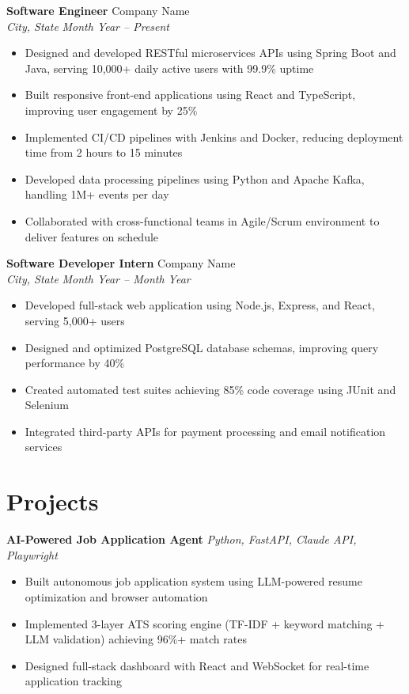 \documentclass[11pt,a4paper]{article}
\begin{document}
\textbf{Software Engineer} \hfill Company Name\\
\textit{City, State} \hfill \textit{Month Year -- Present}
\begin{itemize}
    \item Designed and developed RESTful microservices APIs using Spring Boot and Java, serving 10,000+ daily active users with 99.9\% uptime
    \item Built responsive front-end applications using React and TypeScript, improving user engagement by 25\%
    \item Implemented CI/CD pipelines with Jenkins and Docker, reducing deployment time from 2 hours to 15 minutes
    \item Developed data processing pipelines using Python and Apache Kafka, handling 1M+ events per day
    \item Collaborated with cross-functional teams in Agile/Scrum environment to deliver features on schedule
\end{itemize}

\textbf{Software Developer Intern} \hfill Company Name\\
\textit{City, State} \hfill \textit{Month Year -- Month Year}
\begin{itemize}
    \item Developed full-stack web application using Node.js, Express, and React, serving 5,000+ users
    \item Designed and optimized PostgreSQL database schemas, improving query performance by 40\%
    \item Created automated test suites achieving 85\% code coverage using JUnit and Selenium
    \item Integrated third-party APIs for payment processing and email notification services
\end{itemize}

\section{Projects}

\textbf{AI-Powered Job Application Agent} \hfill \textit{Python, FastAPI, Claude API, Playwright}
\begin{itemize}
    \item Built autonomous job application system using LLM-powered resume optimization and browser automation
    \item Implemented 3-layer ATS scoring engine (TF-IDF + keyword matching + LLM validation) achieving 96\%+ match rates
    \item Designed full-stack dashboard with React and WebSocket for real-time application tracking
\end{itemize}
\end{document}
